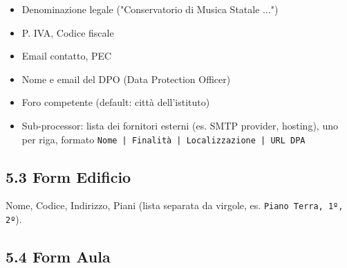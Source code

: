 \documentclass[11pt,a4paper]{article}
\begin{document}
\begin{itemize}
  \item Denominazione legale ("Conservatorio di Musica Statale ...")
  \item P. IVA, Codice fiscale
  \item Email contatto, PEC
  \item Nome e email del DPO (Data Protection Officer)
  \item Foro competente (default: città dell'istituto)
  \item Sub-processor: lista dei fornitori esterni (es. SMTP provider, hosting), uno per riga, formato \texttt{Nome | Finalità | Localizzazione | URL DPA}
\end{itemize}

\subsection{5.3 Form Edificio}


Nome, Codice, Indirizzo, Piani (lista separata da virgole, es. \texttt{Piano Terra, 1º, 2º}).

\subsection{5.4 Form Aula}
\end{document}
